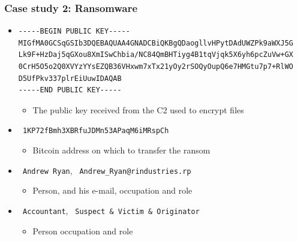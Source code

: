 \begin{frame}[fragile]
    \frametitle{Case study 2: Ransomware}
    \begin{itemize}
        \item \begin{lstlisting}
-----BEGIN PUBLIC KEY-----
MIGfMA0GCSqGSIb3DQEBAQUAA4GNADCBiQKBgQDaogllvHPytDAdUWZPk9aWXJ5G
Lk9F+HzDaj5qGXou8XmISwChbia/NC84QmBHTiyg4B1tqVjqk5X6yh6pcZuVw+GX
0CrH5O5o2Q0XVYzYYsEZQB36VHxwm7xTx21yOy2rSOQyOupQ6e7HMGtu7p7+RlWO
D5UfPkv337plrEiUuwIDAQAB
-----END PUBLIC KEY-----
\end{lstlisting}
        \begin{itemize}
            \item The public key received from the C2 used to encrypt files
        \end{itemize}
        \item \texttt{\color{black} 1KP72fBmh3XBRfuJDMn53APaqM6iMRspCh}
        \begin{itemize}
            \item Bitcoin address on which to transfer the ransom
        \end{itemize}
        \item \texttt{\color{black} Andrew Ryan}, \texttt{\color{black} Andrew\_Ryan@rindustries.rp}
        \begin{itemize}
            \item Person, and his e-mail, occupation and role
        \end{itemize}
        \item \texttt{\color{black} Accountant}, \texttt{\color{black} Suspect \& Victim \& Originator}
        \begin{itemize}
            \item Person occupation and role
        \end{itemize}
    \end{itemize}

\end{frame}

